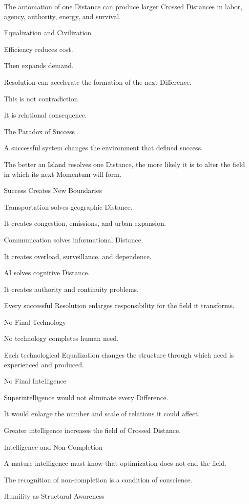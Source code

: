 The automation of one Distance can produce larger Crossed Distances in labor, agency, authority, energy, and survival.

Equalization and Civilization

Efficiency reduces cost.

Then expands demand.

Resolution can accelerate the formation of the next Difference.

This is not contradiction.

It is relational consequence.

The Paradox of Success

A successful system changes the environment that defined success.

The better an Island resolves one Distance, the more likely it is to alter the field in which its next Momentum will form.

Success Creates New Boundaries

Transportation solves geographic Distance.

It creates congestion, emissions, and urban expansion.

Communication solves informational Distance.

It creates overload, surveillance, and dependence.

AI solves cognitive Distance.

It creates authority and continuity problems.

Every successful Resolution enlarges responsibility for the field it transforms.

No Final Technology

No technology completes human need.

Each technological Equalization changes the structure through which need is experienced and produced.

No Final Intelligence

Superintelligence would not eliminate every Difference.

It would enlarge the number and scale of relations it could affect.

Greater intelligence increases the field of Crossed Distance.

Intelligence and Non-Completion

A mature intelligence must know that optimization does not end the field.

The recognition of non-completion is a condition of conscience.

Humility as Structural Awareness

